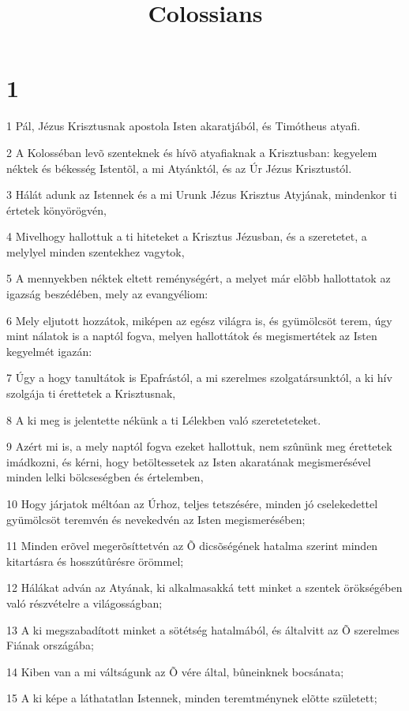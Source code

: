 

\title{Colossians}


\chapter{1}

\par 1 Pál, Jézus Krisztusnak apostola Isten akaratjából, és Timótheus atyafi.
\par 2 A Kolosséban levõ szenteknek és hívõ atyafiaknak a Krisztusban: kegyelem néktek és békesség Istentõl, a mi Atyánktól, és az Úr Jézus Krisztustól.
\par 3 Hálát adunk az Istennek és a mi Urunk Jézus Krisztus Atyjának, mindenkor ti értetek könyörögvén,
\par 4 Mivelhogy hallottuk a ti hiteteket a Krisztus Jézusban, és a szeretetet, a melylyel minden szentekhez vagytok,
\par 5 A mennyekben néktek eltett reménységért, a melyet már elõbb hallottatok az igazság beszédében, mely az evangyéliom:
\par 6 Mely eljutott hozzátok, miképen az egész világra is, és gyümölcsöt terem, úgy mint nálatok is a naptól fogva, melyen hallottátok és megismertétek az Isten kegyelmét igazán:
\par 7 Úgy a hogy tanultátok is Epafrástól, a mi szerelmes szolgatársunktól, a ki hív szolgája ti érettetek a Krisztusnak,
\par 8 A ki meg is jelentette nékünk a ti Lélekben való szereteteteket.
\par 9 Azért mi is, a mely naptól fogva ezeket hallottuk, nem szûnünk meg érettetek imádkozni, és kérni, hogy betöltessetek az Isten akaratának megismerésével minden lelki bölcseségben és értelemben,
\par 10 Hogy járjatok méltóan az Úrhoz, teljes tetszésére, minden jó cselekedettel gyümölcsöt teremvén és nevekedvén az Isten megismerésében;
\par 11 Minden erõvel megerõsíttetvén az Õ dicsõségének hatalma szerint minden kitartásra és hosszútûrésre örömmel;
\par 12 Hálákat adván az Atyának, ki alkalmasakká tett minket a szentek örökségében való részvételre a világosságban;
\par 13 A ki megszabadított minket a sötétség hatalmából, és általvitt az Õ szerelmes Fiának országába;
\par 14 Kiben van a mi váltságunk az Õ vére által, bûneinknek bocsánata;
\par 15 A ki képe a láthatatlan Istennek, minden teremtménynek elõtte született;
